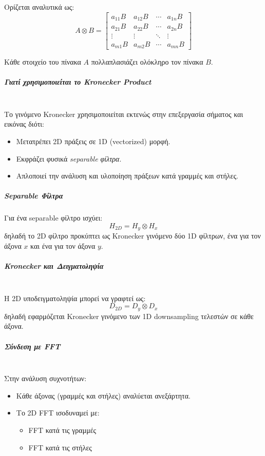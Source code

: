 \documentclass[12pt]{article}
\begin{document}
Ορίζεται αναλυτικά ως:
\[
A \otimes B =
\begin{bmatrix}
a_{11}B & a_{12}B & \cdots & a_{1n}B \\
a_{21}B & a_{22}B & \cdots & a_{2n}B \\
\vdots  & \vdots  & \ddots & \vdots  \\
a_{m1}B & a_{m2}B & \cdots & a_{mn}B
\end{bmatrix}
\]

Κάθε στοιχείο του πίνακα $A$ πολλαπλασιάζει ολόκληρο τον πίνακα $B$.

\subparagraph{Γιατί χρησιμοποιείται το Kronecker Product}
\mbox{} \\
Το γινόμενο Kronecker χρησιμοποιείται εκτενώς στην επεξεργασία σήματος και εικόνας διότι:

\begin{itemize}
    \item Μετατρέπει 2D πράξεις σε 1D (vectorized) μορφή.
    \item Εκφράζει φυσικά \textit{separable φίλτρα}.
    \item Απλοποιεί την ανάλυση και υλοποίηση πράξεων κατά γραμμές και στήλες.
\end{itemize}

\subparagraph{Separable Φίλτρα}

Για ένα separable φίλτρο ισχύει:
\[
H_{2D} = H_y \otimes H_x
\]
δηλαδή το 2D φίλτρο προκύπτει ως Kronecker γινόμενο δύο 1D φίλτρων, ένα για τον άξονα $x$ και ένα για τον άξονα $y$.

\subparagraph{Kronecker και Δειγματοληψία}
\mbox{} \\
Η 2D υποδειγματοληψία μπορεί να γραφτεί ως:
\[
D_{2D} = D_y \otimes D_x
\]
δηλαδή εφαρμόζεται Kronecker γινόμενο των 1D downsampling τελεστών σε κάθε άξονα.

\subparagraph{Σύνδεση με FFT}
\mbox{} \\
Στην ανάλυση συχνοτήτων:

\begin{itemize}
    \item Κάθε άξονας (γραμμές και στήλες) αναλύεται ανεξάρτητα.
    \item Το 2D FFT ισοδυναμεί με:
    \begin{itemize}
        \item FFT κατά τις γραμμές
        \item FFT κατά τις στήλες
    \end{itemize}
\end{itemize}
\end{document}
